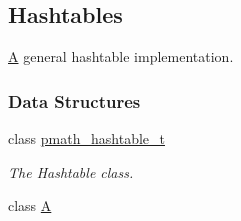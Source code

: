 \hypertarget{group__hashtables}{
\subsection{Hashtables}
\label{group__hashtables}
}
\hyperlink{class_a}{A} general hashtable implementation.  


\subsubsection*{Data Structures}
\begin{CompactItemize}
\item 
class \hyperlink{classpmath__hashtable__t}{pmath\_\-hashtable\_\-t}
\begin{CompactList}\small\item\em The Hashtable class. \item\end{CompactList}\item 
class \hyperlink{class_a}{A}
\end{CompactItemize}
